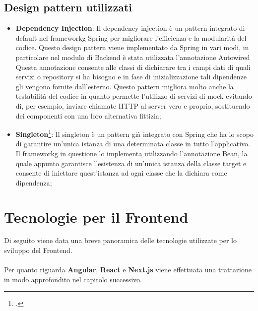 \subsection{Design pattern utilizzati}
\begin{itemize}
	\item \textbf{Dependency Injection}: Il dependency injection è un pattern integrato di default nel \gls{frameworkg} Spring per migliorare l'efficienza e la modularità del codice. Questo design pattern viene implementato da Spring in vari modi, in particolare nel modulo di Backend è stata utilizzata l'annotazione \textsf{Autowired} Questa annotazione consente alle classi di dichiarare tra i campi dati di quali servizi o repository si ha bisogno e in fase di inizializzazione tali dipendenze gli vengono fornite dall'esterno. Questo pattern migliora molto anche la testabilità del codice in quanto permette l'utilizzo di servizi di mock evitando di, per esempio, inviare chiamate HTTP al server vero e proprio, sostituendo dei componenti con una loro alternativa fittizia;
	\item \textbf{Singleton}\footcite{gamma:design-patterns}: Il singleton è un pattern già integrato con Spring che ha lo scopo di garantire un'unica istanza di una determinata classe in tutto l'applicativo. Il \gls{frameworkg} in questione lo implementa utilizzando l'annotazione \textsf{Bean}, la quale appunto garantisce l'esistenza di un'unica istanza della classe target e consente di iniettare quest'istanza ad ogni classe che la dichiara  come dipendenza;
\end{itemize}


\section{Tecnologie per il Frontend}
Di seguito viene data una breve panoramica delle tecnologie utilizzate per lo sviluppo del Frontend. \\ \\
Per quanto riguarda \textbf{Angular}, \textbf{React} e \textbf{Next.js} viene effettuata una trattazione in modo approfondito nel \hyperref[cap:angular-react]{capitolo successivo}.

